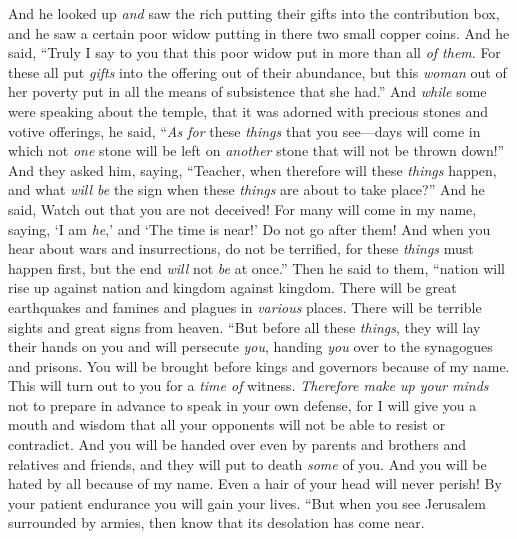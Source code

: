 \begin{biblechapter} %
 And he looked up \textit{and} saw the rich putting their gifts into the contribution box,
\verse and he saw a certain poor widow putting in there two small copper coins.
\verse And he said, “Truly I say to you that this poor widow put in more than all \textit{of them}.
\verse For these all put \textit{gifts} into the offering out of their abundance, but this \textit{woman} out of her poverty put in all the means of subsistence that she had.”
 And \textit{while} some were speaking about the temple, that it was adorned with precious stones and votive offerings, he said,
\verse “\textit{As for} these \textit{things} that you see—days will come in which not \textit{one} stone will be left on \textit{another} stone that will not be thrown down!”
 And they asked him, saying, “Teacher, when therefore will these \textit{things} happen, and what \textit{will be} the sign when these \textit{things} are about to take place?”
\verse And he said, Watch out that you are not deceived! For many will come in my name, saying, ‘I am \textit{he},’ and ‘The time is near!’ Do not go after them!
\verse And when you hear about wars and insurrections, do not be terrified, for these \textit{things} must happen first, but the end \textit{will} not \textit{be} at once.”
\verse Then he said to them, “nation will rise up against nation and kingdom against kingdom.
\verse There will be great earthquakes and famines and plagues in \textit{various} places. There will be terrible sights and great signs from heaven.
 “But before all these \textit{things}, they will lay their hands on you and will persecute \textit{you}, handing \textit{you} over to the synagogues and prisons. You will be brought before kings and governors because of my name.
\verse This will turn out to you for a \textit{time of} witness.
\verse \textit{Therefore make up your minds} not to prepare in advance to speak in your own defense,
\verse for I will give you a mouth and wisdom that all your opponents will not be able to resist or contradict.
\verse And you will be handed over even by parents and brothers and relatives and friends, and they will put to death \textit{some} of you.
\verse And you will be hated by all because of my name.
\verse Even a hair of your head will never perish!
\verse By your patient endurance you will gain your lives.
 “But when you see Jerusalem surrounded by armies, then know that its desolation has come near.

\end{biblechapter}

